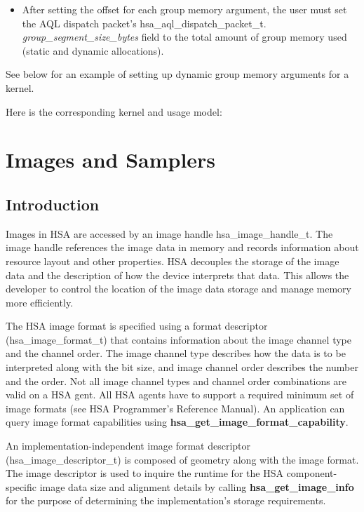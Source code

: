 \documentclass{book}
\newcommand{\reffun}[1]{\textbf{#1}}
\newcommand{\reffld}[1]{\textit{#1}}
\newcommand{\reftyp}[1]{#1}
\begin{document}
\begin{appendices}
\begin{itemize}
\item After setting the offset for each group memory argument, the
  user must set the AQL dispatch packet's
  \reftyp{hsa\_aql\_dispatch\_packet\_t}.\reffld{
    group\_segment\_size\_bytes} field to the total amount of group
  memory used (static and dynamic allocations).

\end{itemize}

See below for an example of setting up dynamic group memory
arguments for a kernel.


Here is the corresponding kernel and usage model:



\chapter{Images and Samplers}
\label{images} \hypertarget{images}{}
\hypertarget{Images}{\section{Introduction} \label{images}} Images in
HSA are accessed by an image handle \reftyp{hsa\_image\_handle\_t}. The
image handle references the image data in memory and records
information about resource layout and other properties. HSA decouples
the storage of the image data and the description of how the device
interprets that data. This allows the developer to control the
location of the image data storage and manage memory more efficiently.

The HSA image format is specified using a format descriptor
(\reftyp{hsa\_image\_format\_t}) that contains information about the
image channel type and the channel order. The image channel type
describes how the data is to be interpreted along with the bit size,
and image channel order describes the number and the order. Not all
image channel types and channel order combinations are valid on a HSA
gent. All HSA agents have to support a required minimum set of image
formats (see HSA Programmer’s Reference Manual). An application can
query image format capabilities using
\reffun{hsa\_get\_image\_format\_capability}.

An implementation-independent image format descriptor
(\reftyp{hsa\_image\_descriptor\_t}) is composed of geometry along with
the image format. The image descriptor is used to inquire the runtime
for the HSA component-specific image data size and alignment details
by calling \reffun{hsa\_get\_image\_info} for the purpose of determining
the implementation’s storage requirements.


\end{appendices}
\end{document}
